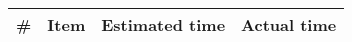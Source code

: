 \begin{longtable}{cXcc}
\toprule
\textbf{\#} & \textbf{Item} & \textbf{Estimated time}  & \textbf{Actual time}

\\ \bottomrule
\end{longtable}
